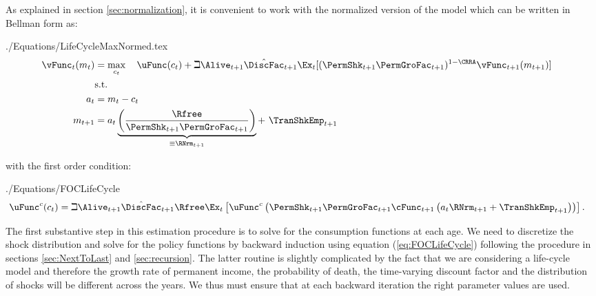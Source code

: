 \documentclass[titlepage, headings=optiontotocandhead]{\econtex}
\begin{document}
As explained in section \ref{sec:normalization}, it is convenient to work with the normalized version of the model which can be written in Bellman form as:
\begin{verbatimwrite}{./Equations/LifeCycleMaxNormed.tex}
  \begin{equation*}\begin{gathered}\begin{aligned}
        {\vFunc}_{t}({m}_{t})  & = \max_{{c}_{t}}~~~ \uFunc({c}_{t})+\beth\Alive_{t+1}\hat{\DiscFac}_{t+1}
          \Ex_{t}[(\PermShk_{t+1}\PermGroFac_{t+1})^{1-\CRRA}{\vFunc}_{t+1}({m}_{t+1})]   \\
        & \text{s.t.} &   \nonumber \\
        {a}_{t}    & = {m}_{t}-{c}_{t} \nonumber
        \\      {m}_{t+1}  & = {a}_{t}\underbrace{\left(\frac{\Rfree}{\PermShk_{t+1}\PermGroFac_{t+1}}\right)}_{\equiv \RNrm_{t+1}}+ ~\TranShkEmp_{t+1}
      \end{aligned}\end{gathered}\end{equation*}
\end{verbatimwrite}
\unskip
with the first order condition:
\begin{verbatimwrite}{./Equations/FOCLifeCycle}
\begin{equation}\begin{gathered}\begin{aligned}
      \uFunc^{{c}}({c}_{t}) & = \beth\Alive_{t+1}\hat{\DiscFac}_{t+1}\Rfree \Ex_{t}\left[\uFunc^{{c}}\left(\PermShk_{t+1}\PermGroFac_{t+1}\cFunc_{t+1}\left({a}_{t}\RNrm_{t+1}+\TranShkEmp_{t+1}\right)\right)\right]\label{eq:FOCLifeCycle}
      .
    \end{aligned}\end{gathered}\end{equation}
\end{verbatimwrite}


The first substantive step in this estimation procedure is
to solve for the consumption functions at each age. We need to
discretize the shock distribution and solve for the policy
functions by backward induction using equation (\ref{eq:FOCLifeCycle})
following the procedure in sections \ref{sec:NextToLast} and
\ref{sec:recursion}. The latter routine
is slightly complicated by the fact that we are considering a
life-cycle model and therefore the growth rate of permanent income,
the probability of death, the time-varying discount factor and the
distribution of shocks will be different across the years. We thus
must ensure that at each backward iteration the right parameter
values are used.
\end{document}
